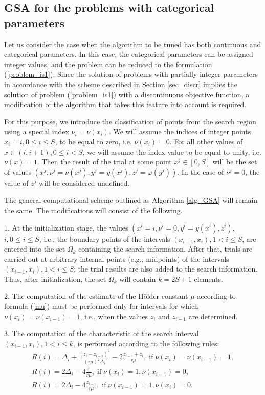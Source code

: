 \documentclass[preprint,12pt]{elsarticle}
\begin{document}
\subsection{GSA for the problems with categorical parameters}
\label{sec_mGSA}

Let us consider the case when the algorithm to be tuned has both continuous and categorical parameters.  In this case, the categorical parameters can be assigned integer values, and the problem can be reduced to the formulation (\ref{problem_is1}).
Since the solution of problems with partially integer parameters in accordance with the scheme described in Section \ref{sec_discr} implies the solution of problem (\ref{problem_is1}) with a discontinuous objective function, a modification of the algorithm that takes this feature into account is required.

For this purpose, we introduce the classification of points from the search region using a special index $\nu_i=\nu(x_i)$. We will assume the indices of integer points $x_i = i, 0\leq i \leq S$, to be equal to zero, i.e. $\nu(x_i) = 0$. For all other values of $x\in(i,i+1),  0 \leq i < S$, we will assume the index value to be equal to unity, i.e.  $\nu(x) = 1$. Then the result of the trial at some point $x^j\in[0,S]$  will be the set of values $(x^j, \nu^j=\nu(x^j), y^j=y(x^j), z^j = \varphi(y^j))$. In the case of  $\nu^j=0$, the value of $z^j$ will be considered undefined.

The general computational scheme outlined as Algorithm \ref{alg_GSA} will remain the same. The modifications will consist of the following.

1. At the initialization stage, the values $(x^i = i, \nu^i=0, y^i=y(x^i), z^i)$, $ i, 0\leq i \leq S$, i.e., the boundary points of the intervals $(x_{i-1},x_i), 1<i\leq S$, are entered into the set $\Omega_k$ containing the search  information. 
After that, trials are carried out at arbitrary internal points (e.g., midpoints) of the intervals $(x_{i-1},x_i), 1<i\leq S$; the trial results are also added to the search information. Thus, after initialization, the set $\Omega_k$ will contain $k=2S+1$ elements.

2. The computation of the estimate of the H\"older constant $\mu$ according to formula (\ref{mu}) must be performed only for intervals for which $\nu(x_i) = \nu(x_{i-1}) = 1$, i.e., when the values $z_i$ and $z_{i-1}$ are determined.

3. The computation of the characteristic of the search interval $(x_{i-1},x_i), 1<i\leq k$, is performed according to the following rules:
\begin{gather}\label{R_int}
R(i) = \Delta_i + \frac{(z_i-z_{i-1})^2}{(r\mu)^2\Delta_i}-2\frac{z_{i-1}+z_i}{r\mu}, \; \mathrm{if} \; \nu(x_i) = \nu(x_{i-1}) = 1, \nonumber \\ 
R(i) = 2\Delta_i-4\frac{z_i}{r\mu}, \; \mathrm{if} \;  \nu(x_i) = 1, \nu(x_{i-1}) = 0, \nonumber \\ 
R(i) = 2\Delta_i-4\frac{z_{i-1}}{r\mu}, \; \mathrm{if} \;  \nu(x_{i-1}) = 1, \nu(x_{i}) = 0. \nonumber
\end{gather}
\end{document}
